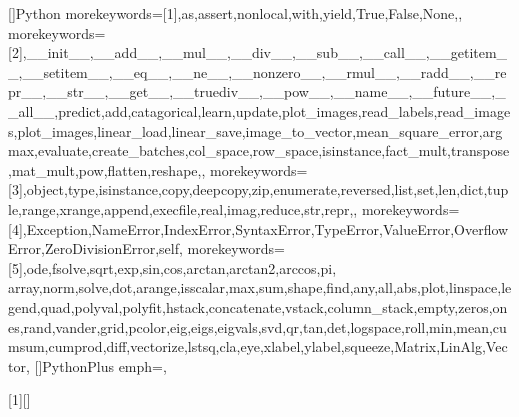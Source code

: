 []{Python}{
  morekeywords=[1]{,as,assert,nonlocal,with,yield,True,False,None,}, %
  morekeywords=[2]{,__init__,__add__,__mul__,__div__,__sub__,__call__,__getitem__,__setitem__,__eq__,__ne__,__nonzero__,__rmul__,__radd__,__repr__,__str__,__get__,__truediv__,__pow__,__name__,__future__,__all__,predict,add,catagorical,learn,update,plot_images,read_labels,read_images,plot_images,linear_load,linear_save,image_to_vector,mean_square_error,argmax,evaluate,create_batches,col_space,row_space,isinstance,fact_mult,transpose,mat_mult,pow,flatten,reshape,}, %
  morekeywords=[3]{,object,type,isinstance,copy,deepcopy,zip,enumerate,reversed,list,set,len,dict,tuple,range,xrange,append,execfile,real,imag,reduce,str,repr,}, %
  morekeywords=[4]{,Exception,NameError,IndexError,SyntaxError,TypeError,ValueError,OverflowError,ZeroDivisionError,self}, %
  morekeywords=[5]{,ode,fsolve,sqrt,exp,sin,cos,arctan,arctan2,arccos,pi,
  array,norm,solve,dot,arange,isscalar,max,sum,shape,find,any,all,abs,plot,linspace,legend,quad,polyval,polyfit,hstack,concatenate,vstack,column_stack,empty,zeros,ones,rand,vander,grid,pcolor,eig,eigs,eigvals,svd,qr,tan,det,logspace,roll,min,mean,cumsum,cumprod,diff,vectorize,lstsq,cla,eye,xlabel,ylabel,squeeze,Matrix,LinAlg,Vector}, %
}
[]{PythonPlus}{
  emph={},
}


\newcommand\pythonstyle{\lstset{
style=colorEX,
language=PyBrIM,
}}


[1][]
{
\pythonstyle
\lstset{#1}
}
{}


\newcommand\pythonexternal[2][]{{
\pythonstyle
}}

\newcommand\pythoninline[1]{{\pythonstyle\lstinline!#1!}}



